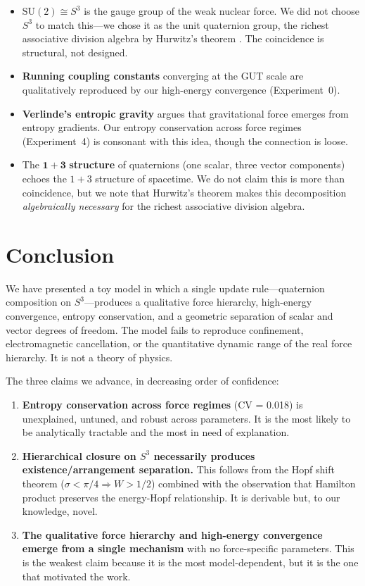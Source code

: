 \documentclass[letterpaper,12pt]{article}
\begin{document}
\begin{itemize}
  \item $\mathrm{SU}(2) \cong S^3$ is the gauge group of the weak nuclear force. We did not choose $S^3$ to match this---we chose it as the unit quaternion group, the richest associative division algebra by Hurwitz's theorem \cite{Hurwitz1898}. The coincidence is structural, not designed.
  \item \textbf{Running coupling constants} converging at the GUT scale \cite{Amaldi1991} are qualitatively reproduced by our high-energy convergence (Experiment~0).
  \item \textbf{Verlinde's entropic gravity} \cite{Verlinde2011} argues that gravitational force emerges from entropy gradients. Our entropy conservation across force regimes (Experiment~4) is consonant with this idea, though the connection is loose.
  \item The $\mathbf{1+3}$ \textbf{structure} of quaternions (one scalar, three vector components) echoes the $1+3$ structure of spacetime. We do not claim this is more than coincidence, but we note that Hurwitz's theorem makes this decomposition \emph{algebraically necessary} for the richest associative division algebra.
\end{itemize}

\section{Conclusion}

We have presented a toy model in which a single update rule---quaternion composition on $S^3$---produces a qualitative force hierarchy, high-energy convergence, entropy conservation, and a geometric separation of scalar and vector degrees of freedom. The model fails to reproduce confinement, electromagnetic cancellation, or the quantitative dynamic range of the real force hierarchy. It is not a theory of physics.

The three claims we advance, in decreasing order of confidence:

\begin{enumerate}
  \item \textbf{Entropy conservation across force regimes} (CV = 0.018) is unexplained, untuned, and robust across parameters. It is the most likely to be analytically tractable and the most in need of explanation.

  \item \textbf{Hierarchical closure on $S^3$ necessarily produces existence/arrangement separation.} This follows from the Hopf shift theorem ($\sigma < \pi/4 \Rightarrow W > 1/2$) combined with the observation that Hamilton product preserves the energy-Hopf relationship. It is derivable but, to our knowledge, novel.

  \item \textbf{The qualitative force hierarchy and high-energy convergence emerge from a single mechanism} with no force-specific parameters. This is the weakest claim because it is the most model-dependent, but it is the one that motivated the work.
\end{enumerate}
\end{document}

